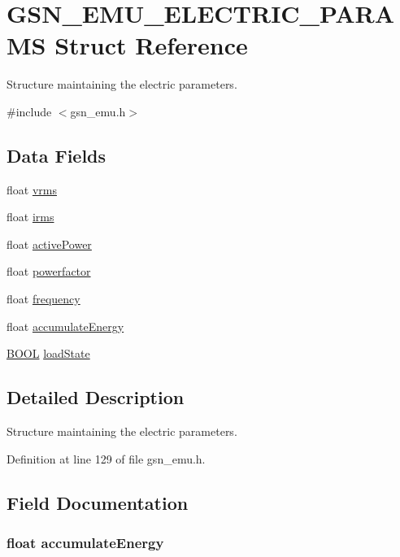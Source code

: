\hypertarget{a00060}{
\section{GSN\_\-EMU\_\-ELECTRIC\_\-PARAMS Struct Reference}
\label{a00060}
}


Structure maintaining the electric parameters.  




{\ttfamily \#include $<$gsn\_\-emu.h$>$}

\subsection*{Data Fields}
\begin{DoxyCompactItemize}
\item 
float \hyperlink{a00060_a1466cf22de01e2faf786b69e44e4902f}{vrms}
\item 
float \hyperlink{a00060_af9b0db3f42bdf3f755afe229084986a8}{irms}
\item 
float \hyperlink{a00060_aabf327ff94458c4f133aec441d0de13c}{activePower}
\item 
float \hyperlink{a00060_a29927bc0ca13e270d492593d749bf42e}{powerfactor}
\item 
float \hyperlink{a00060_acdfc8898c9e67fbcec81f3b04ae61bd9}{frequency}
\item 
float \hyperlink{a00060_aebabdaa64f056a946a619c69d25ae98a}{accumulateEnergy}
\item 
\hyperlink{a00660_ga1f04022c0a182c51c059438790ea138c}{BOOL} \hyperlink{a00060_ac85c98c5028bc52183b644943b10a682}{loadState}
\end{DoxyCompactItemize}


\subsection{Detailed Description}
Structure maintaining the electric parameters. 

Definition at line 129 of file gsn\_\-emu.h.



\subsection{Field Documentation}
\hypertarget{a00060_aebabdaa64f056a946a619c69d25ae98a}{
\subsubsection[{accumulateEnergy}]{\setlength{\rightskip}{0pt plus 5cm}float {\bf accumulateEnergy}}}
\label{a00060_aebabdaa64f056a946a619c69d25ae98a}



